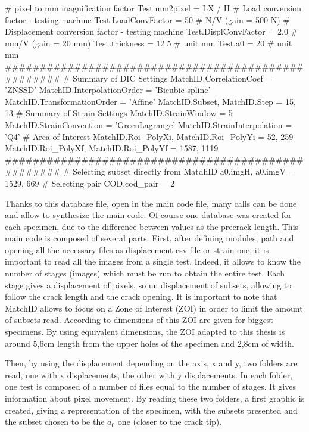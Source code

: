 \begin{customFrame}
# pixel to mm magnification factor
Test.mm2pixel = LX / H
# Load conversion factor - testing machine
Test.LoadConvFactor = 50  # N/V (gain = 500 N)
# Displacement conversion factor - testing machine
Test.DisplConvFactor = 2.0  # mm/V (gain = 20 mm)
Test.thickness = 12.5 # unit  mm
Test.a0 = 20 # unit  mm
###################################################
# Summary of DIC Settings
MatchID.CorrelationCoef = 'ZNSSD'
MatchID.InterpolationOrder = 'Bicubic spline'
MatchID.TransformationOrder = 'Affine'
MatchID.Subset, MatchID.Step = 15, 13
# Summary of Strain Settings
MatchID.StrainWindow = 5
MatchID.StrainConvention = 'GreenLagrange'
MatchID.StrainInterpolation = 'Q4'
# Area of Interest
MatchID.Roi_PolyXi, MatchID.Roi_PolyYi = 52, 259
MatchID.Roi_PolyXf, MatchID.Roi_PolyYf = 1587, 1119
###################################################
# Selecting subset directly from MatdhID
a0.imgH, a0.imgV = 1529, 669
# Selecting pair
COD.cod_pair = 2

\end{customFrame}

Thanks to this database file, open in the main code file, many calls can be done and allow to synthesize the main code. Of course one database was created for each specimen, due to the difference between values as the precrack length.
This main code is composed of several parts. First, after defining modules, path and opening all the necessary files as displacement csv file or strain one, it is important to read all the images from a single test. Indeed, it allows to know the number of stages (images) which must be run to obtain the entire test. Each stage gives a displacement of pixels, so un displacement of subsets, allowing to follow the crack length and the crack opening. It is important to note that MatchID allows to focus on a Zone of Interest (ZOI) in order to limit the amount of subsets read. According to \parencite{Reference7} dimensions of this ZOI are given for biggest specimens. By using equivalent dimensions, the ZOI adapted to this thesis is around 5,6cm length from the upper holes of the specimen and 2,8cm of width.

Then, by using the displacement depending on the axis, x and y, two folders are read, one with x displacements, the other with y displacements. In each folder, one test is composed of a number of files equal to the number of stages. It gives information about pixel movement. By reading these two folders, a first graphic is created, giving a representation of the specimen, with the subsets presented and the subset chosen to be the $a_{0}$ one (closer to the crack tip).

